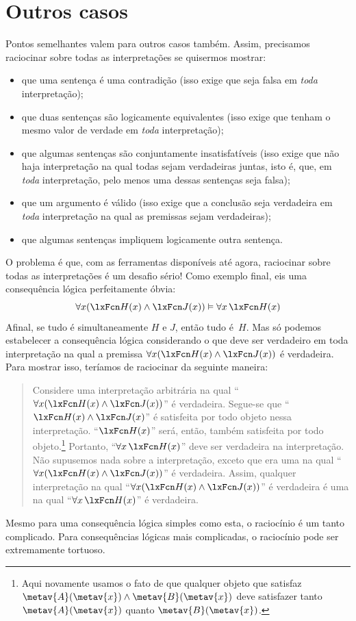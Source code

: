 \section{Outros casos}
Pontos semelhantes valem para outros casos também. Assim, precisamos raciocinar sobre todas as interpretações se quisermos mostrar:
	\begin{itemize}
\item que uma sentença é uma contradição (isso exige que seja falsa em \emph{toda} interpretação);
\item que duas sentenças são logicamente equivalentes (isso exige que tenham o mesmo valor de verdade em \emph{toda} interpretação);
\item que algumas sentenças são conjuntamente insatisfatíveis (isso exige que não haja interpretação na qual todas sejam verdadeiras juntas, isto é, que, em \emph{toda} interpretação, pelo menos uma dessas sentenças seja falsa);
\item que um argumento é válido (isso exige que a conclusão seja verdadeira em \emph{toda} interpretação na qual as premissas sejam verdadeiras);
\item que algumas sentenças impliquem logicamente outra sentença.
	\end{itemize}
O problema é que, com as ferramentas disponíveis até agora, raciocinar sobre todas as interpretações é um desafio sério! Como exemplo final, eis uma consequência lógica perfeitamente óbvia:
	$$\forall x(\atom{H}{x} \eand \atom{J}{x}) \entails \forall x\, \atom{H}{x}$$
Afinal, se tudo é simultaneamente $H$ e $J$, então tudo é~$H$.
Mas só podemos estabelecer a consequência lógica considerando o que deve ser
verdadeiro em toda interpretação na qual a premissa $\forall
x(\atom{H}{x} \eand \atom{J}{x})$ é verdadeira. Para mostrar isso, teríamos
de raciocinar da seguinte maneira:
	\begin{quote}
Considere uma interpretação arbitrária na qual \textquotedblleft $\forall x(\atom{H}{x} \eand \atom{J}{x})$\textquotedblright{} é verdadeira. Segue-se que \textquotedblleft $\atom{H}{x} \eand \atom{J}{x}$\textquotedblright{} é satisfeita por todo objeto nessa interpretação. \textquotedblleft $\atom{H}{x}$\textquotedblright{} será, então, também satisfeita por todo objeto.\footnote{Aqui novamente usamos o fato de que qualquer objeto que satisfaz $\metav{A}(\metav{x}) \land \metav{B}(\metav{x})$ deve satisfazer tanto $\metav{A}(\metav{x})$ quanto $\metav{B}(\metav{x})$.} Portanto, \textquotedblleft $\forall x\, \atom{H}{x}$\textquotedblright{} deve ser verdadeira na interpretação. Não supusemos nada sobre a interpretação, exceto que era uma na qual \textquotedblleft $\forall x(\atom{H}{x} \eand \atom{J}{x})$\textquotedblright{} é verdadeira. Assim, qualquer interpretação na qual \textquotedblleft $\forall x(\atom{H}{x} \eand \atom{J}{x})$\textquotedblright{} é verdadeira é uma na qual \textquotedblleft $\forall x\, \atom{H}{x}$\textquotedblright{} é verdadeira.
\end{quote}
Mesmo para uma consequência lógica simples como esta, o raciocínio é um tanto complicado. Para consequências lógicas mais complicadas, o raciocínio pode ser extremamente tortuoso.

